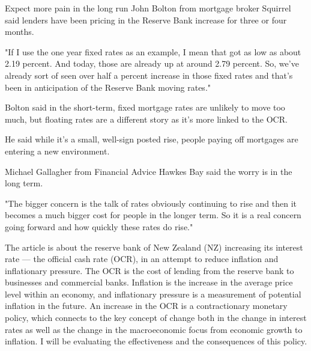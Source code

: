 \documentclass[a4paper,12pt]{article}
\begin{document}
{Expect more pain in the long run
John Bolton from mortgage broker Squirrel said lenders have been pricing in the Reserve Bank increase for three or four months.

"If I use the one year fixed rates as an example, I mean that got as low as about 2.19 percent. And today, those are already up at around 2.79 percent. So, we've already sort of seen over half a percent increase in those fixed rates and that's been in anticipation of the Reserve Bank moving rates."

Bolton said in the short-term, fixed mortgage rates are unlikely to move too much, but floating rates are a different story as it's more linked to the OCR.

He said while it's a small, well-sign posted rise, people paying off mortgages are entering a new environment.

Michael Gallagher from Financial Advice Hawkes Bay said the worry is in the long term.

"The bigger concern is the talk of rates obviously continuing to rise and then it becomes a much bigger cost for people in the longer term. So it is a real concern going forward and how quickly these rates do rise."

\newpage
}


The article is about the reserve bank of New Zealand (NZ) increasing its interest rate --- the official cash rate (OCR), in an attempt to reduce inflation and inflationary pressure. The OCR is the cost of lending from the reserve bank to businesses and commercial banks. Inflation is the increase in the average price level within an economy, and inflationary pressure is a measurement of potential inflation in the future. An increase in the OCR is a contractionary monetary policy, which connects to the key concept of change both in the change in interest rates as well as the change in the macroeconomic focus from economic growth to inflation. I will be evaluating the effectiveness and the consequences of this policy.
\end{document}

